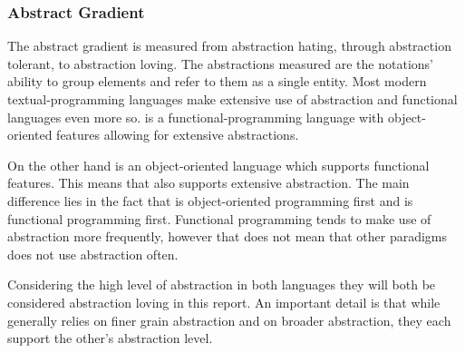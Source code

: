 \subsubsection{Abstract Gradient}
The abstract gradient is measured from abstraction hating, through abstraction tolerant, to abstraction loving. The abstractions measured are the notations' ability to group elements and refer to them as a single entity. Most modern textual-programming languages make extensive use of abstraction and functional languages even more so\cite{hudak1989conception}. \fs is a functional-programming language with object-oriented features allowing for extensive abstractions.

On the other hand \cs is an object-oriented language which supports functional features. This means that \cs also supports extensive abstraction. The main difference lies in the fact that \cs is object-oriented programming first and \fs is functional programming first. Functional programming tends to make use of abstraction more frequently, however that does not mean that other paradigms does not use abstraction often.

Considering the high level of abstraction in both languages they will both be considered abstraction loving in this report. An important detail is that while \fs generally relies on finer grain abstraction and \cs on broader abstraction, they each support the other's abstraction level.
